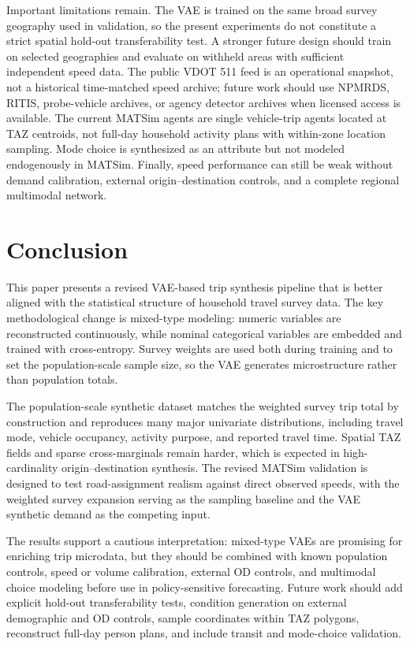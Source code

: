 \documentclass[3p,times,procedia]{elsarticle}
\begin{document}
Important limitations remain. The VAE is trained on the same broad survey geography used in validation, so the present experiments do not constitute a strict spatial hold-out transferability test. A stronger future design should train on selected geographies and evaluate on withheld areas with sufficient independent speed data. The public VDOT 511 feed is an operational snapshot, not a historical time-matched speed archive; future work should use NPMRDS, RITIS, probe-vehicle archives, or agency detector archives when licensed access is available. The current MATSim agents are single vehicle-trip agents located at TAZ centroids, not full-day household activity plans with within-zone location sampling. Mode choice is synthesized as an attribute but not modeled endogenously in MATSim. Finally, speed performance can still be weak without demand calibration, external origin--destination controls, and a complete regional multimodal network.

\section{Conclusion}
This paper presents a revised VAE-based trip synthesis pipeline that is better aligned with the statistical structure of household travel survey data. The key methodological change is mixed-type modeling: numeric variables are reconstructed continuously, while nominal categorical variables are embedded and trained with cross-entropy. Survey weights are used both during training and to set the population-scale sample size, so the VAE generates microstructure rather than population totals.

The population-scale synthetic dataset matches the weighted survey trip total by construction and reproduces many major univariate distributions, including travel mode, vehicle occupancy, activity purpose, and reported travel time. Spatial TAZ fields and sparse cross-marginals remain harder, which is expected in high-cardinality origin--destination synthesis. The revised MATSim validation is designed to test road-assignment realism against direct observed speeds, with the weighted survey expansion serving as the sampling baseline and the VAE synthetic demand as the competing input.

The results support a cautious interpretation: mixed-type VAEs are promising for enriching trip microdata, but they should be combined with known population controls, speed or volume calibration, external OD controls, and multimodal choice modeling before use in policy-sensitive forecasting. Future work should add explicit hold-out transferability tests, condition generation on external demographic and OD controls, sample coordinates within TAZ polygons, reconstruct full-day person plans, and include transit and mode-choice validation.
\end{document}
